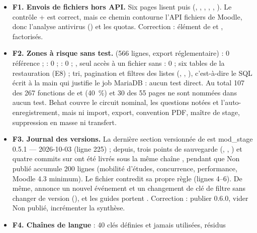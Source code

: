 \documentclass[11pt,a4paper]{article}
\newcommand{\grav}[1]{\textbf{\textcolor{#1}{\textbullet}}}
\newcommand{\maj}{\grav{orange}}
\newcommand{\mineure}{\grav{gray}}
\begin{document}
\begin{itemize}
  \item[\maj] \textbf{F1. Envois de fichiers hors API.} Six pages lisent  puis
     (, ,
    , ,
    , ). Le contrôle
     +  est correct, mais ce chemin contourne l'API
    fichiers de Moodle, donc l'analyse antivirus () et les quotas. Correction :
    élément  de  et , factorisés.
  \item[\maj] \textbf{F2. Zones à risque sans test.}  (566 lignes, export
    réglementaire) : 0 référence ;  : 0 ;  : 0 ;
    , seul accès à un fichier sans  : 0 ; six
    tables de la restauration (E8) ; tri, pagination et filtres des listes (,
    , ), c'est-à-dire
    le SQL écrit à la main qui justifie le job MariaDB : aucun test direct. Au total 107 des 267
    fonctions de  et  (40~\%) et 30 des 55 pages ne sont nommées
    dans aucun test. Behat couvre le circuit nominal, les questions notées et l'auto-enregistrement,
    mais ni import, export, convention PDF, maître de stage, suppression en masse ni transfert.
  \item[\maj] \textbf{F3. Journal des versions.} La dernière section versionnée de
     est \og mod\_stage 0.5.1 --- 2026-10-03\fg{} (ligne 225) ; depuis,
    trois points de sauvegarde (, , ) et
    quatre commits sur  ont été livrés sous la même chaîne ,
    pendant que \og Non publié\fg{} accumule 200 lignes (mobilité d'études, concurrence,
    performance, Moodle 4.3 minimum). Le fichier contredit sa propre règle (lignes 4--6). De même,
     annonce un nouvel événement et un changement de clé de filtre sans
    changer de version (), et les guides portent .
    Correction : publier 0.6.0, vider \og Non publié\fg{}, incrémenter la synthèse.
  \item[\mineure] \textbf{F4. Chaînes de langue} : 40 clés définies et jamais utilisées, résidus

\end{itemize}
\end{document}

